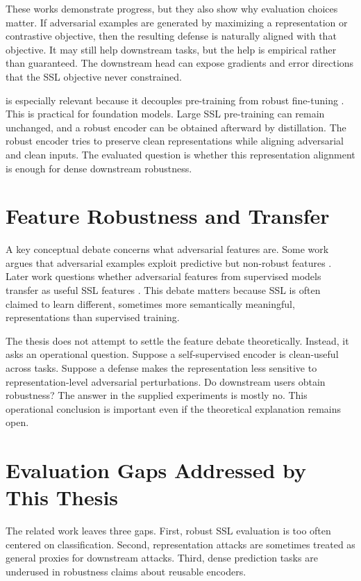These works demonstrate progress, but they also show why evaluation choices matter. If adversarial examples are generated by maximizing a representation or contrastive objective, then the resulting defense is naturally aligned with that objective. It may still help downstream tasks, but the help is empirical rather than guaranteed. The downstream head can expose gradients and error directions that the SSL objective never constrained.

\DeACL is especially relevant because it decouples pre-training from robust fine-tuning \parencite{zhang2022decoupled}. This is practical for foundation models. Large SSL pre-training can remain unchanged, and a robust encoder can be obtained afterward by distillation. The robust encoder tries to preserve clean representations while aligning adversarial and clean inputs. The evaluated question is whether this representation alignment is enough for dense downstream robustness.

\section{Feature Robustness and Transfer}

A key conceptual debate concerns what adversarial features are. Some work argues that adversarial examples exploit predictive but non-robust features \parencite{ilyas2019adversarialbugs}. Later work questions whether adversarial features from supervised models transfer as useful SSL features \parencite{li2023adversarialnotbugs}. This debate matters because SSL is often claimed to learn different, sometimes more semantically meaningful, representations than supervised training.

The thesis does not attempt to settle the feature debate theoretically. Instead, it asks an operational question. Suppose a self-supervised encoder is clean-useful across tasks. Suppose a defense makes the representation less sensitive to representation-level adversarial perturbations. Do downstream users obtain robustness? The answer in the supplied experiments is mostly no. This operational conclusion is important even if the theoretical explanation remains open.

\section{Evaluation Gaps Addressed by This Thesis}

The related work leaves three gaps. First, robust SSL evaluation is too often centered on classification. Second, representation attacks are sometimes treated as general proxies for downstream attacks. Third, dense prediction tasks are underused in robustness claims about reusable encoders.

